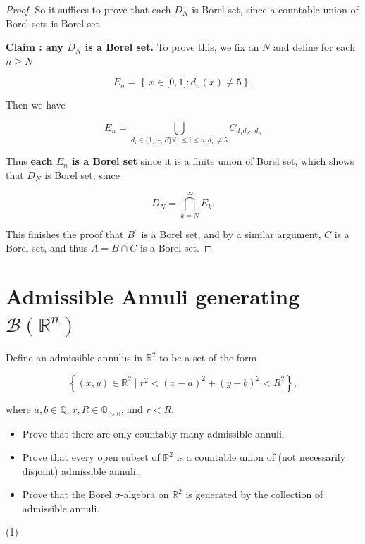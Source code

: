 \documentclass{qlnotes-export}
\begin{document}
\begin{proof}
So it suffices to prove that each \(D_{N}\) is Borel set, since a countable union of Borel sets is Borel set.

\textbf{Claim : any \(D_{N}\) is a Borel set.} To prove this, we fix an \(N\) and define for each \(n \geq N\)

\[E_{n} = \left\{ {\, x \in \lbrack 0,1\rbrack:d_{n}(x) \neq 5} \right\}.\]

Then we have

\[E_{n} = \bigcup\limits_{d_{i} \in {\{{1,\cdots,F}\}}\forall 1 \leq i \leq n,d_{n} \neq 5}C_{d_{1}d_{2}\cdots d_{n}}\]

Thus \textbf{each \(E_{n}\) is a Borel set} since it is a finite union of Borel set, which shows that \(D_{N}\) is Borel set, since

\[D_{N} = \bigcap\limits_{k = N}^{\infty}E_{k}.\]

This finishes the proof that \(B^{c}\) is a Borel set, and by a similar argument, \(C\) is a Borel set, and thus \(A = B \cap C\) is a Borel set.

\end{proof}

\section{\texorpdfstring{Admissible Annuli generating \(\mathcal{B}({\mathbb{R}}^{n})\)}{Admissible Annuli generating \textbackslash mathcal\{B\}(\{\textbackslash mathbb\{R\}\}\^{}\{n\})}}\label{admissible-annuli-generating-mathcalbmathbbrn}

Define an admissible annulus in \({\mathbb{R}}^{2}\) to be a set of the form

\[\left\{ {(x,y) \in {\mathbb{R}}^{2} \mid r^{2} < (x - a)^{2} + (y - b)^{2} < R^{2}} \right\},\]

where \(a,b \in {\mathbb{Q}}\), \(r,R \in {\mathbb{Q}}_{> 0}\), and \(r < R\).

\begin{itemize}
\item
  Prove that there are only countably many admissible annuli.
\item
  Prove that every open subset of \({\mathbb{R}}^{2}\) is a countable union of (not necessarily disjoint) admissible annuli.
\item
  Prove that the Borel \(\sigma\)-algebra on \({\mathbb{R}}^{2}\) is generated by the collection of admissible annuli.
\end{itemize}

(1)
\end{document}
